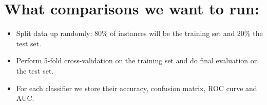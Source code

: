 \documentclass[a4paper,11pt]{article}
\begin{document}
\section*{What comparisons we want to run:}
\begin{itemize}
	\item Split data up randomly: 80\% of instances will be the training set and 20\% the test set.
	\item Perform 5-fold cross-validation on the training set and do final evaluation on the test set.
	\item For each classifier we store their accuracy, confusion matrix, ROC curve and AUC.
\end{itemize}
\end{document}
